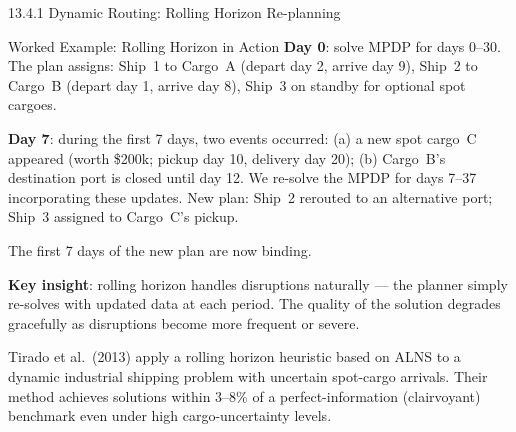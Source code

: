 \documentclass[aspectratio=169,10pt]{beamer}
\begin{document}
\begin{frame}[allowframebreaks]{13.4.1 Dynamic Routing: Rolling Horizon Re-planning}
\begin{exampleblock}{Worked Example: Rolling Horizon in Action}
    \textbf{Day 0}: solve MPDP for days 0--30.  The plan assigns:
    Ship~1 to Cargo~A (depart day 2, arrive day 9),
    Ship~2 to Cargo~B (depart day 1, arrive day 8),
    Ship~3 on standby for optional spot cargoes.

    \textbf{Day 7}: during the first 7 days, two events occurred:
    (a) a new spot cargo~C appeared (worth \$200k; pickup day 10, delivery
    day 20); (b) Cargo~B's destination port is closed until day 12.
    We re-solve the MPDP for days 7--37 incorporating these updates.
    New plan: Ship~2 rerouted to an alternative port; Ship~3 assigned
    to Cargo~C's pickup.

    The first 7 days of the new plan are now binding.

    \textbf{Key insight}: rolling horizon handles disruptions naturally ---
    the planner simply re-solves with updated data at each period.
    The quality of the solution degrades gracefully as disruptions
    become more frequent or severe.
  \end{exampleblock}

  Tirado et al.\ (2013) apply a rolling horizon heuristic based on ALNS
  to a dynamic industrial shipping problem with uncertain spot-cargo arrivals.
  Their method achieves solutions within 3--8\% of a perfect-information
  (clairvoyant) benchmark even under high cargo-uncertainty levels.
\end{frame}
\end{document}
